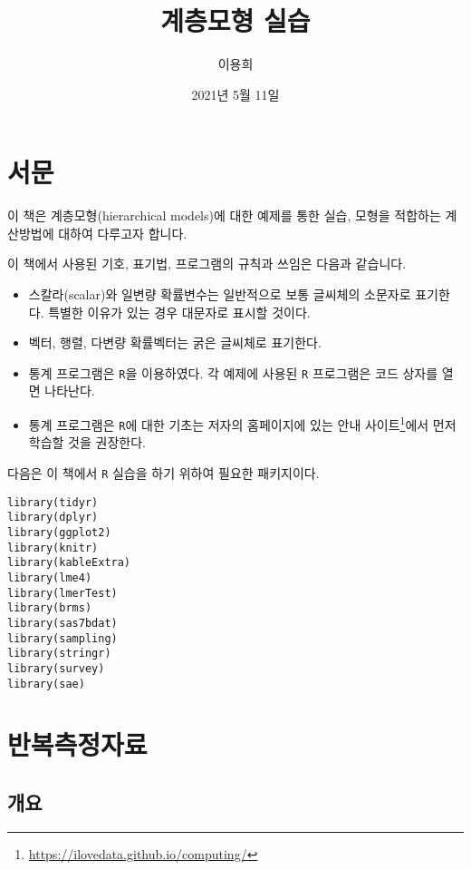 \documentclass[
]{book}
\title{계층모형 실습}
\author{이용희}
\date{2021년 5월 11일}
\makeatletter
\providecommand{\tightlist}{%
  \setlength{\itemsep}{0pt}\setlength{\parskip}{0pt}}
\renewcommand{\href}[2]{#2\footnote{\url{#1}}}
\newenvironment{kframe}{%
\medskip{}
\setlength{\fboxsep}{.8em}
 \def\at@end@of@kframe{}%
 \ifinner\ifhmode%
  \def\at@end@of@kframe{\end{minipage}}%
  \begin{minipage}{\columnwidth}%
 \fi\fi%
 \def\FrameCommand##1{\hskip\@totalleftmargin \hskip-\fboxsep
 \colorbox{shadecolor}{##1}\hskip-\fboxsep
     \hskip-\linewidth \hskip-\@totalleftmargin \hskip\columnwidth}%
 \MakeFramed {\advance\hsize-\width
   \@totalleftmargin\z@ \linewidth\hsize
   \@setminipage}}%
 {\par\unskip\endMakeFramed%
 \at@end@of@kframe}
\newenvironment{rmdblock}[1]
  {
  \begin{itemize}
  \renewcommand{\labelitemi}{
    \raisebox{-.7\height}[0pt][0pt]{
      {\setkeys{Gin}{width=3em,keepaspectratio}\texttt{[image: images/\#1]}}
    }
  }
  \setlength{\fboxsep}{1em}
  \begin{kframe}
  \item
  }
  {
  \end{kframe}
  \end{itemize}
  }
\newenvironment{rmdimportant}
  {\begin{rmdblock}{important}}
  {\end{rmdblock}}
\makeatother
\begin{document}
\maketitle

{
\setcounter{tocdepth}{1}
\tableofcontents
}
\hypertarget{uxc11cuxbb38}{%
\chapter*{서문}\label{uxc11cuxbb38}}

이 책은 계층모형(hierarchical models)에 대한 예제를 통한 실습, 모형을 적합하는 계산방법에 대하여 다루고자 합니다.

\begin{rmdimportant}
이 책에서 사용된 기호, 표기법, 프로그램의 규칙과 쓰임은 다음과 같습니다.

\begin{itemize}
\tightlist
\item
  스칼라(scalar)와 일변량 확률변수는 일반적으로 보통 글씨체의 소문자로 표기한다. 특별한 이유가 있는 경우 대문자로 표시할 것이다.
\item
  벡터, 행렬, 다변량 확률벡터는 굵은 글씨체로 표기한다.\\
\item
  통계 프로그램은 \texttt{R}을 이용하였다. 각 예제에 사용된 \texttt{R} 프로그램은 코드 상자를 열면 나타난다.
\item
  통계 프로그램은 \texttt{R}에 대한 기초는 저자의 홈페이지에 있는 \href{https://ilovedata.github.io/computing/}{안내 사이트}에서 먼저 학습할 것을 권장한다.
\end{itemize}
\end{rmdimportant}

다음은 이 책에서 \texttt{R} 실습을 하기 위하여 필요한 패키지이다.

\begin{verbatim}
library(tidyr)
library(dplyr)
library(ggplot2)
library(knitr)
library(kableExtra)
library(lme4)
library(lmerTest)
library(brms)
library(sas7bdat)
library(sampling)
library(stringr)
library(survey)
library(sae)
\end{verbatim}

\mainmatter

\hypertarget{sleep}{%
\chapter{반복측정자료}\label{sleep}}

\hypertarget{uxac1cuxc694}{%
\section{개요}\label{uxac1cuxc694}}
\end{document}

